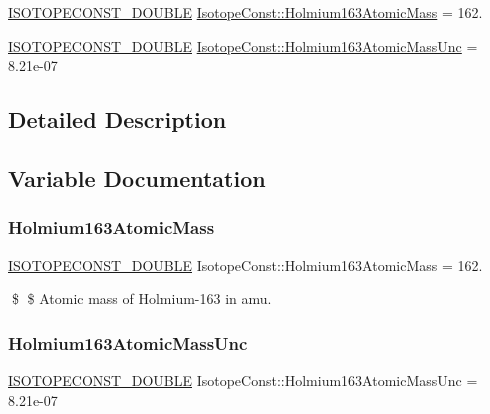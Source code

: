 \begin{DoxyCompactItemize}
\item 
\mbox{\hyperlink{group___isotope_const-_macros_ga8f45a7272ce02c0b4c65c44636ed719a}{I\+S\+O\+T\+O\+P\+E\+C\+O\+N\+S\+T\+\_\+\+D\+O\+U\+B\+LE}} \mbox{\hyperlink{group___isotope_const-_holmium-_ho163_ga8889f34f6d40e4fb9e9e59e055339c5e}{Isotope\+Const\+::\+Holmium163\+Atomic\+Mass}} = 162.
\item 
\mbox{\hyperlink{group___isotope_const-_macros_ga8f45a7272ce02c0b4c65c44636ed719a}{I\+S\+O\+T\+O\+P\+E\+C\+O\+N\+S\+T\+\_\+\+D\+O\+U\+B\+LE}} \mbox{\hyperlink{group___isotope_const-_holmium-_ho163_ga7a41b72ad6adbe70175dc63df4eecfd3}{Isotope\+Const\+::\+Holmium163\+Atomic\+Mass\+Unc}} = 8.\+21e-\/07
\end{DoxyCompactItemize}


\subsection{Detailed Description}


\subsection{Variable Documentation}
\mbox{\label{group___isotope_const-_holmium-_ho163_ga8889f34f6d40e4fb9e9e59e055339c5e}} 
\subsubsection{\texorpdfstring{Holmium163\+Atomic\+Mass}{Holmium163AtomicMass}}
{\footnotesize\ttfamily \mbox{\hyperlink{group___isotope_const-_macros_ga8f45a7272ce02c0b4c65c44636ed719a}{I\+S\+O\+T\+O\+P\+E\+C\+O\+N\+S\+T\+\_\+\+D\+O\+U\+B\+LE}} Isotope\+Const\+::\+Holmium163\+Atomic\+Mass = 162.}

\$ \$ Atomic mass of Holmium-\/163 in amu. \mbox{\label{group___isotope_const-_holmium-_ho163_ga7a41b72ad6adbe70175dc63df4eecfd3}} 
\subsubsection{\texorpdfstring{Holmium163\+Atomic\+Mass\+Unc}{Holmium163AtomicMassUnc}}
{\footnotesize\ttfamily \mbox{\hyperlink{group___isotope_const-_macros_ga8f45a7272ce02c0b4c65c44636ed719a}{I\+S\+O\+T\+O\+P\+E\+C\+O\+N\+S\+T\+\_\+\+D\+O\+U\+B\+LE}} Isotope\+Const\+::\+Holmium163\+Atomic\+Mass\+Unc = 8.\+21e-\/07}

